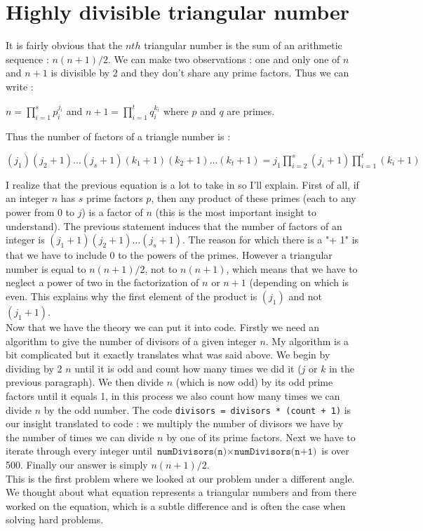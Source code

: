 \documentclass[11pt]{article}
\begin{document}
\section{Highly divisible triangular number} 
It is fairly obvious that the $nth$ triangular number is the sum of an arithmetic sequence : $n(n+1)/2$. We can make two observations : one and only one of $n$ and $n+1$ is divisible by 2 and they don't share any prime factors. Thus we can write :
\begin{center}
$n=\displaystyle\prod_{i=1}^{s}{p_{i}^{j_{i}}}$ and $n+1=\displaystyle\prod_{i=1}^{t}{q_{i}^{k_{i}}}$ where $p$ and $q$ are primes.
\end{center}
Thus the number of factors of a triangle number is :
\begin{center}
$(j_{1})(j_{2}+1)\dots(j_{s}+1)(k_{1}+1)(k_{2}+1)\dots(k_{t}+1)=j_{1}\displaystyle\prod_{i=2}^{s}(j_{i}+1)\displaystyle\prod_{i=1}^{t}(k_{i}+1)$
\end{center}
I realize that the previous equation is a lot to take in so I'll explain. First of all, if an integer $n$ has $s$ prime factors $p$, then any product of these primes (each to any power from 0 to $j$) is a factor of $n$ (this is the most important insight to understand). The previous statement induces that the number of factors of an integer is $(j_{1}+1)(j_{2}+1)\dots(j_{s}+1)$. The reason for which there is a "+ 1" is that we have to include 0 to the powers of the primes. However a triangular number is equal to $n(n+1)/2$, not to $n(n+1)$, which means that we have to neglect a power of two in the factorization of $n$ or $n+1$ (depending on which is even. This explains why the first element of the product is $(j_{1})$ and not $(j_{1}+1)$.
\\Now that we have the theory we can put it into code. Firstly we need an algorithm to give the number of divisors of a given integer $n$. My algorithm is a bit complicated but it exactly translates what was said above. We begin by dividing by 2 $n$ until it is odd and count how many times we did it ($j$ or $k$ in the previous paragraph). We then divide $n$ (which is now odd) by its odd prime factors until it equals 1, in this process we also count how many times we can divide $n$ by the odd number. The code \texttt{divisors = divisors * (count + 1)} is our insight translated to code : we multiply the number of divisors we have by the number of times we can divide $n$ by one of its prime factors. Next we have to iterate through every integer until $\texttt{numDivisors(n)}\times\texttt{numDivisors(n+1)}$ is over 500. Finally our answer is simply $n(n+1)/2$.
\\This is the first problem where we looked at our problem under a different angle. We thought about what equation represents a triangular numbers and from there worked on the equation, which is a subtle difference and is often the case when solving hard problems.
\end{document}
